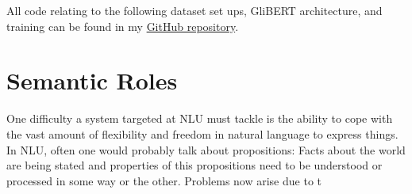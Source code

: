 All code relating to the following dataset set ups, GliBERT architecture, and training can be found in
my \href{https://github.com/JonathanSchaber/Masterarbeit}{GitHub repository}.


\section{Semantic Roles}
\label{sec:semantic-roles}



One difficulty a system targeted at NLU must tackle is the ability to cope with the vast amount of
flexibility and freedom in natural language to express things. In NLU, often one would probably
talk about propositions: Facts about the world are being stated and properties of this propositions
need to be understood or processed in some way or the other.
{\color{red} Problems now arise due to t}

